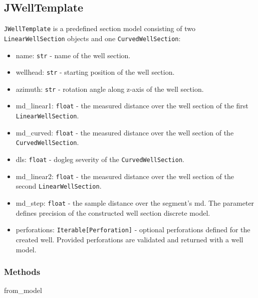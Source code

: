 \documentclass[english,10pt,a4paper]{article}
\begin{document}
\subsection{JWellTemplate}
\texttt{JWellTemplate} is a predefined section model consisting of two \texttt{LinearWellSection} objects and one \texttt{CurvedWellSection}:
\begin{itemize}
	\item  \colorbox{gray!20}{name:} \texttt{str} - name of the well section.
	\item  \colorbox{gray!20}{wellhead:} \texttt{str} - starting position of the well section.
	\item  \colorbox{gray!20}{azimuth:} \texttt{str} - rotation angle along z-axis of the well section.
	\item  \colorbox{gray!20}{md\_linear1:} \texttt{float} - the measured distance over the well section of the first \texttt{LinearWellSection}.
	\item  \colorbox{gray!20}{md\_curved:} \texttt{float} - the measured distance over the well section of the \texttt{CurvedWellSection}.
	\item  \colorbox{gray!20}{dls:} \texttt{float} - dogleg severity of the \texttt{CurvedWellSection}.
	\item  \colorbox{gray!20}{md\_linear2:} \texttt{float} - the measured distance over the well section of the second \texttt{LinearWellSection}.
	\item  \colorbox{gray!20}{md\_step:} \texttt{float} - the sample distance over the segment's md. The parameter defines precision of the constructed well section discrete model.
	\item  \colorbox{gray!20}{perforations:} \texttt{Iterable[Perforation]} - optional perforations defined for the created well. Provided perforations are validated and returned with a well model.
\end{itemize}
\subsubsection{Methods}
\begin{description}
	\item[\colorbox{gray!20}{from\_model}] \hfill
\end{description}
\end{document}
